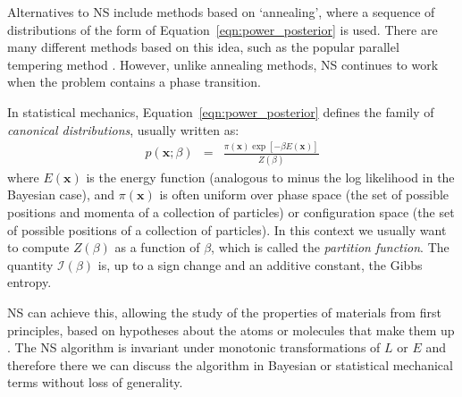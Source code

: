 \documentclass[journal,article,accept,moreauthors,pdftex,12pt,a4paper]{mdpi}
\newcommand{\xx}{\boldsymbol{x}}
\begin{document}
Alternatives to NS include methods based on `annealing', where a sequence of
distributions of the form of Equation~\ref{eqn:power_posterior} is used.
There are many different methods based on this idea, such as the popular
parallel tempering method \citep{pt}.
However, unlike annealing methods, NS continues
to work when the problem contains a phase transition.

In statistical mechanics, Equation~\ref{eqn:power_posterior} defines the
family of {\it canonical distributions}, usually written as:
\begin{eqnarray}
p(\xx; \beta) &=& \frac{\pi(\xx)\exp[-\beta E(\xx)]}{Z(\beta)}
\end{eqnarray}
where $E(\xx)$ is the energy function (analogous to minus the log likelihood
in the Bayesian case), and $\pi(\xx)$ is often uniform over
phase space (the set of possible positions and momenta of a collection of
particles) or configuration space (the set of possible positions of a collection
of particles). In this context we usually want to
compute $Z(\beta)$ as a function of $\beta$, which is called the
{\it partition function}. The quantity $\mathcal{I}(\beta)$ is, up to a sign
change and an additive constant, the Gibbs entropy.

NS can achieve this, allowing the study of
the properties of materials from first principles, based on hypotheses about
the atoms or molecules that make them up \citep[e.g.][]{2009arXiv0906.3544P,
2014PhRvE..89b2302P, 2015arXiv150303404B}. The NS algorithm is invariant under
monotonic transformations of $L$ or $E$ and therefore there we can discuss the
algorithm in Bayesian or statistical mechanical terms without loss of
generality.
\end{document}
